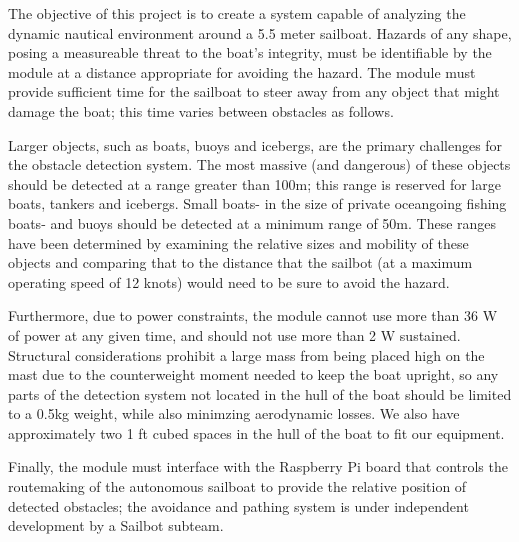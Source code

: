 The objective of this project is to create a system capable of analyzing the dynamic nautical environment around a 5.5 meter sailboat. Hazards of any shape, posing a measureable threat to the boat's integrity, must be identifiable by the module at a distance appropriate for avoiding the hazard. The module must provide sufficient time for the sailboat to steer away from any object that might damage the boat; this time varies between obstacles as follows.

Larger objects, such as boats, buoys and icebergs, are the primary challenges for the obstacle detection system. The most massive (and dangerous) of these objects should be detected at a range greater than 100m; this range is reserved for large boats, tankers and icebergs. Small boats- in the size of private oceangoing fishing boats- and buoys should be detected at a minimum range of 50m. These ranges have been determined by examining the relative sizes and mobility of these objects and comparing that to the distance that the sailbot (at a maximum operating speed of 12 knots) would need to be sure to avoid the hazard.

Furthermore, due to power constraints, the module cannot use more than 36 W of power at any given time, and should not use more than 2 W sustained. Structural considerations prohibit a large mass from being placed high on the mast due to the counterweight moment needed to keep the boat upright, so any parts of the detection system not located in the hull of the boat should be limited to a 0.5kg weight, while also minimzing aerodynamic losses. We also have approximately two 1 ft cubed spaces in the hull of the boat to fit our equipment. 

Finally, the module must interface with the Raspberry Pi board that controls the routemaking of the autonomous sailboat to provide the relative position of detected obstacles; the avoidance and pathing system is under independent development by a Sailbot subteam.

